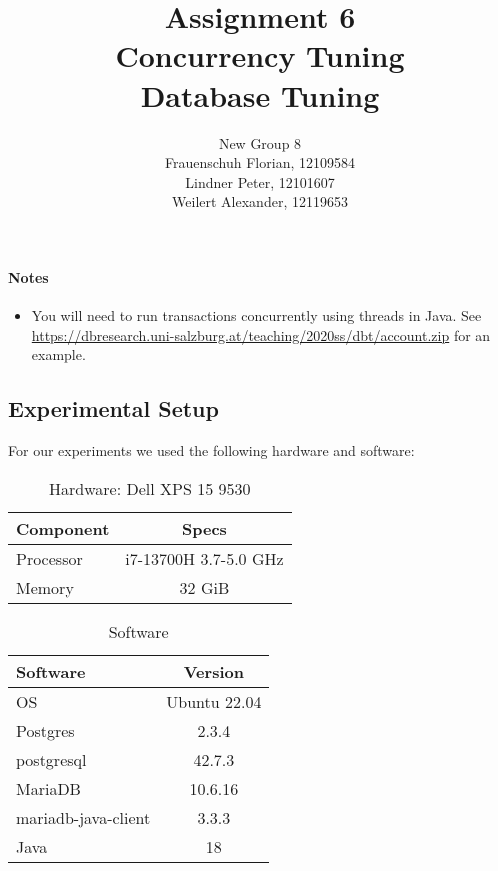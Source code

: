 \documentclass[11pt]{scrartcl}
\title{
  \textbf{\large Assignment 6} \\
  Concurrency Tuning \\
  {\large Database Tuning}}
\author{
  New Group 8 \\
  \large Frauenschuh Florian, 12109584 \\
  \large Lindner Peter, 12101607 \\
  \large Weilert Alexander, 12119653
}
\begin{document}
\maketitle

\paragraph{Notes}

\begin{itemize}
  \item You will need to run transactions concurrently using threads in Java. See \\ \url{https://dbresearch.uni-salzburg.at/teaching/2020ss/dbt/account.zip} for an example.
\end{itemize}

\subsection*{Experimental Setup}

For our experiments we used the following hardware and software:

\begin{multicols}{2}
  \begin{table}[H]
    \centering
    \begin{tabular}{lc}
      \toprule
      Component & Specs \\
      \midrule
      Processor & i7-13700H 3.7-5.0 GHz \\
      Memory & 32 GiB \\
      \bottomrule
    \end{tabular}
    \caption{Hardware: Dell XPS 15 9530}
    \label{table:hardware}
  \end{table}

  \columnbreak

  \begin{table}[H]
    \centering
    \begin{tabular}{lc}
      \toprule
      Software & Version \\
      \midrule
      OS & Ubuntu 22.04 \\
      Postgres & 2.3.4 \\
      postgresql & 42.7.3 \\
      MariaDB & 10.6.16 \\
      mariadb-java-client & 3.3.3 \\
      Java & 18 \\
      \bottomrule
    \end{tabular}
    \caption{Software}
    \label{table:software_versions}
  \end{table}
\end{multicols}
\end{document}
